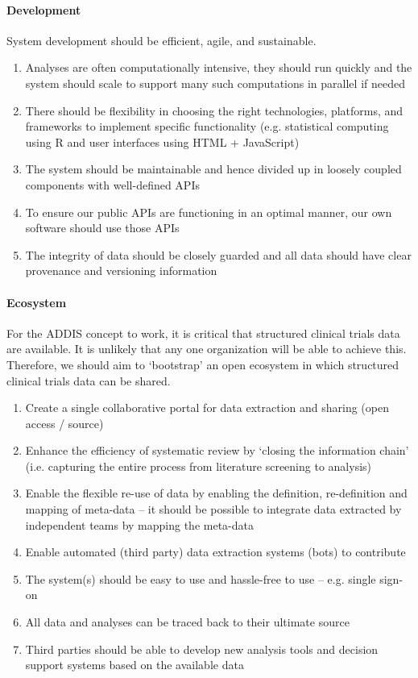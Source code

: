 \documentclass[a4paper]{article}
\begin{document}
\paragraph{Development}
System development should be efficient, agile, and sustainable.
\begin{enumerate}[label=D\arabic*]
\item\label{dComputation} Analyses are often computationally intensive, they should run quickly and the system should scale to support many such computations in parallel if needed
\item\label{dPlatform} There should be flexibility in choosing the right technologies, platforms, and frameworks to implement specific functionality (e.g. statistical computing using R and user interfaces using HTML + JavaScript)
\item\label{dModular} The system should be maintainable and hence divided up in loosely coupled components with well-defined APIs
\item\label{dDogfood} To ensure our public APIs are functioning in an optimal manner, our own software should use those APIs
\item\label{dIntegrity} The integrity of data should be closely guarded and all data should have clear provenance and versioning information
\end{enumerate}

\paragraph{Ecosystem}
For the ADDIS concept to work, it is critical that structured clinical trials data are available.
It is unlikely that any one organization will be able to achieve this.
Therefore, we should aim to `bootstrap' an open ecosystem in which structured clinical trials data can be shared.
\begin{enumerate}[label=E\arabic*]
\item\label{ePortal} Create a single collaborative portal for data extraction and sharing (open access / source)
\item\label{eReview} Enhance the efficiency of systematic review by `closing the information chain' (i.e. capturing the entire process from literature screening to analysis)
\item\label{eMap} Enable the flexible re-use of data by enabling the definition, re-definition and mapping of meta-data -- it should be possible to integrate data extracted by independent teams by mapping the meta-data
\item\label{eBot} Enable automated (third party) data extraction systems (bots) to contribute
\item\label{eEaseOfUse} The system(s) should be easy to use and hassle-free to use -- e.g. single sign-on
\item\label{eTraceability} All data and analyses can be traced back to their ultimate source
\item\label{eThirdParty} Third parties should be able to develop new analysis tools and decision support systems based on the available data
\end{enumerate}
\end{document}
